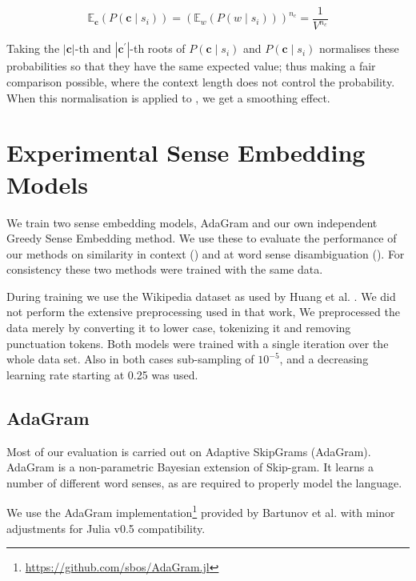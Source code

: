 \documentclass{sig-alternate}
\renewcommand{\c}{\mathbf{c}}
\begin{document}

\begin{equation} \label{eq:expectcontexprob}
\mathbb{E}_\c(P(\c \mid s_{i}))
=(\mathbb{E}_w(P(w \mid s_i)))^{n_c}
= \frac{1}{V^{n_c}}
\end{equation}

Taking the $|\c|$-th and $|\c^\prime|$-th roots of $P(\c \mid s_{i})$ and $P(\c \mid s_{i})$ normalises these probabilities so that they have the same expected value; thus making a fair comparison possible, where the context length does not control the probability.
When this normalisation is applied to , we get a smoothing effect.

\section{Experimental Sense Embedding Models}
We train two sense embedding models, AdaGram \parencite{AdaGrams} and our own independent Greedy Sense Embedding method. We use these to evaluate the performance of our methods on similarity in context () and at word sense disambiguation (). For consistency these two methods were trained with the same data.

During training we use the Wikipedia dataset as used by Huang et al. \parencite{Huang2012}.
We did not perform the extensive preprocessing used in that work,
We preprocessed the data merely by converting it to lower case, tokenizing it and removing punctuation tokens.
Both models were trained with a single iteration over the whole data set.
Also in both cases sub-sampling of $10^{-5}$, and a decreasing learning rate starting at 0.25 was used.

\subsection{AdaGram}
Most of our evaluation is carried out on Adaptive SkipGrams (AdaGram)\parencite{AdaGrams}. AdaGram is a non-parametric Bayesian extension of Skip-gram. It learns a number of different word senses, as are required to properly model the language.

We use the AdaGram \parencite{AdaGrams} implementation\footnote{\url{https://github.com/sbos/AdaGram.jl}} provided by Bartunov et al. with minor adjustments for Julia \parencite{Julia} v0.5 compatibility.
\end{document}
